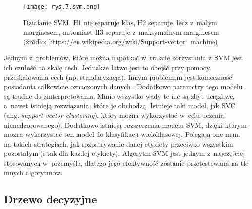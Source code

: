 \begin{figure}[h]
    \centering
    \texttt{[image: rys.7.svm.png]}
    \caption{Działanie SVM. H1 nie separuje klas, H2 separuje, lecz z~małym marginesem, natomiast H3 separuje z~maksymalnym marginesem \protect\linebreak 
		(źródło: \protect\href{https://en.wikipedia.org/wiki/Support-vector_machine}{https://en.wikipedia.org/wiki/Support-vector\_machine})}
    \label{fig:mesh7}
\end{figure}
\noindent Jednym z~problemów, które można napotkać w~trakcie korzystania z~SVM jest ich czułość na skalę cech. Jednakże łatwo jest to obejść przy pomocy przeskalowania cech (np. standaryzacja). Innym problemem jest konieczność posiadania całkowicie oznaczonych danych \cite{Hur02}. Dodatkowo parametry tego modelu są trudne do zinterpretowania. Mimo wszystko wady te nie są zbyt uciążliwe, a~nawet istnieją rozwiązania, które je obchodzą. Istnieje taki model, jak SVC (ang. \textit{support-vector clustering}), który można wykorzystać w~celu uczenia nienadzorowanego). Dodatkowo istnieją rozszerzenia modelu SVM, dzięki którym można wykorzystać ten model do klasyfikacji wieloklasowej. Polegają one m.in. na takich strategiach, jak rozpatrywanie danej etykiety przeciwko wszystkim pozostałym (i tak dla każdej etykiety). Algorytm SVM jest jednym z~najczęściej stosowanych w~przemyśle, dlatego jego efektywność zostanie przetestowana na tle innych algorytmów.

\subsection{Drzewo decyzyjne}
\label{cha:Drzewo decyzyjne}

